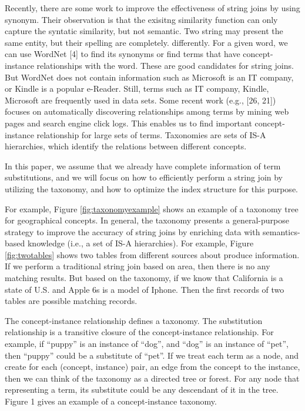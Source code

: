 Recently, there are some work to improve the effectiveness of string joins by using synonym. Their observation is that the exisitng similarity function can only capture the syntatic similarity, but not semantic. Two string may present the same entity, but their spelling are completely. differently. For a given word, we can use WordNet [4] to find its synonyms
or find terms that have concept-instance relationships
with the word. These are good candidates for string joins. But WordNet does not contain information such as
Microsoft is an IT company, or Kindle is a popular e-Reader.
Still, terms such as IT company, Kindle, Microsoft are frequently
used in data sets. Some recent work (e.g., [26, 21])
focuses on automatically discovering relationships among
terms by mining web pages and search engine click logs.
This enables us to find important concept-instance relationship
for large sets of terms.
 Taxonomies are sets of IS-A hierarchies, which identify the relations between different concepts.

In this paper, we assume that we already have complete
information of term substitutions, and we will focus on how
to efficiently perform a string join by utilizing the taxonomy, and how to optimize the index structure
for this purpose.

For example, Figure \ref{fig:taxonomyexample} shows an example of a taxonomy tree for geographical concepts.   In general, the taxonomy presents a general-purpose strategy to improve the accuracy of string joins by enriching data with semantics-based knowledge  (i.e., a set of IS-A hierarchies). For example, Figure \ref{fig:twotables} shows two tables  from different sources about produce information. If we perform a traditional string join based on area, then there is no any matching results. But based on the taxonomy, if we know that California is a state of U.S. and Apple 6s is a model of Iphone. Then the first records of two tables are possible matching records.

The concept-instance
relationship defines a taxonomy. The substitution relationship
is a transitive closure of the concept-instance relationship.
For example, if ``puppy'' is an instance of ``dog'', and
``dog'' is an instance of ``pet'', then ``puppy'' could be a substitute
of ``pet''. If we treat each term as a node, and create
for each (concept, instance) pair, an edge from the concept
to the instance, then we can think of the taxonomy as a directed tree or forest. For any node that representing a term,
its substitute could be any descendant of it in the tree. Figure
1 gives an example of a concept-instance taxonomy.


